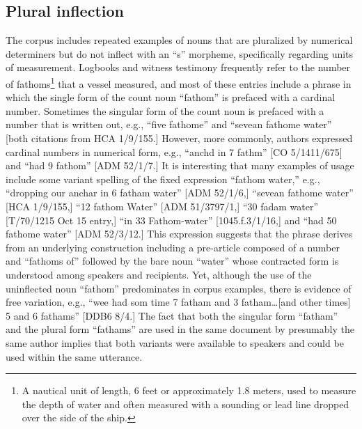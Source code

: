 \subsection{\textbf{Plural} \textbf{inflection}}%

The corpus includes repeated examples of nouns that are pluralized by numerical determiners but do not inflect with an “s” morpheme, specifically regarding units of measurement. Logbooks and witness testimony frequently refer to the number of fathoms\footnote{A nautical unit of length, 6 feet or approximately 1.8 meters, used to measure the depth of water and often measured with a sounding or lead line dropped over the side of the ship.} that a vessel measured, and most of these entries include a phrase in which the single form of the count noun “fathom” is prefaced with a cardinal number. Sometimes the singular form of the count noun is prefaced with a number that is written out, e.g., “five fathome” and “sevean fathome water” [both citations from HCA 1/9/155.] However, more commonly, authors expressed cardinal numbers in numerical form, e.g., “anchd in 7 fathm” [CO 5/1411/675] and “had 9 fathom” [ADM 52/1/7.] It is interesting that many examples of usage include some variant spelling of the fixed expression “fathom water,” e.g., “dropping our anchar in 6 fatham water” [ADM 52/1/6,] “sevean fathome water” [HCA 1/9/155,] “12 fathom Water” [ADM 51/3797/1,] “30 fadam water” [T/70/1215 Oct 15 entry,] “in 33 Fathom-water” [1045.f.3/1/16,] and “had 50 fathome water” [ADM 52/3/12.] This expression suggests that the phrase derives from an underlying construction including a pre-article composed of a number and “fathoms of” followed by the bare noun “water” whose contracted form is understood among speakers and recipients. Yet, although the use of the uninflected noun “fathom” predominates in corpus examples, there is evidence of free variation, e.g., “wee had som time 7 fatham and 3 fatham…[and other times] 5 and 6 fathams” [DDB6 8/4.] The fact that both the singular form “fatham” and the plural form “fathams” are used in the same document by presumably the same author implies that both variants were available to speakers and could be used within the same utterance. 

